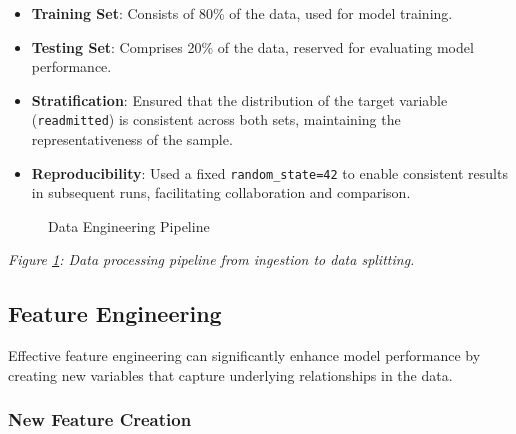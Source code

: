\documentclass{article}
\begin{document}
\begin{itemize}[leftmargin=*]
    \item \textbf{Training Set}: Consists of 80\% of the data, used for model training.
    \item \textbf{Testing Set}: Comprises 20\% of the data, reserved for evaluating model performance.
    \item \textbf{Stratification}: Ensured that the distribution of the target variable (\texttt{readmitted}) is consistent across both sets, maintaining the representativeness of the sample.
    \item \textbf{Reproducibility}: Used a fixed \texttt{random\_state=42} to enable consistent results in subsequent runs, facilitating collaboration and comparison.
\end{itemize}

\begin{figure}[H]
    \centering
    \caption{Data Engineering Pipeline}
    \label{fig:data_engineering_pipeline}
\end{figure}

\textit{Figure \ref{fig:data_engineering_pipeline}: Data processing pipeline from ingestion to data splitting.}

\subsection{Feature Engineering}

Effective feature engineering can significantly enhance model performance by creating new variables that capture underlying relationships in the data.

\subsubsection{New Feature Creation}
\end{document}
